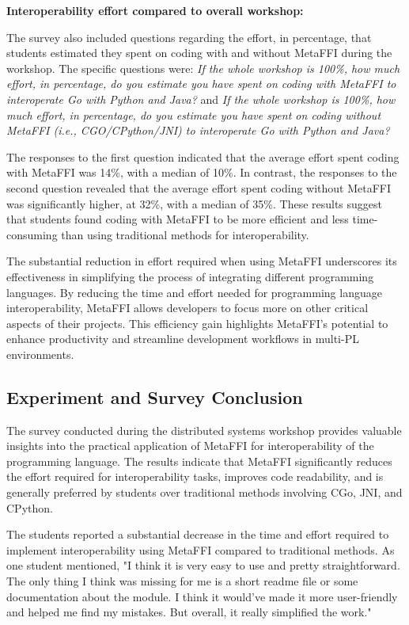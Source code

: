 \documentclass[sigplan,10pt,manuscript,nonacm]{acmart}
\begin{document}
\textbf{Interoperability effort compared to overall workshop:}

The survey also included questions regarding the effort, in percentage, that students estimated they spent on coding with and without MetaFFI during the workshop. The specific questions were: 
\textit{If the whole workshop is 100\%, how much effort, in percentage, do you estimate you have spent on coding with MetaFFI to interoperate Go with Python and Java?} and \textit{If the whole workshop is 100\%, how much effort, in percentage, do you estimate you have spent on coding without MetaFFI (i.e., CGO/CPython/JNI) to interoperate Go with Python and Java?}

The responses to the first question indicated that the average effort spent coding with MetaFFI was 14\%, with a median of 10\%. In contrast, the responses to the second question revealed that the average effort spent coding without MetaFFI was significantly higher, at 32\%, with a median of 35\%. These results suggest that students found coding with MetaFFI to be more efficient and less time-consuming than using traditional methods for interoperability.

The substantial reduction in effort required when using MetaFFI underscores its effectiveness in simplifying the process of integrating different programming languages. By reducing the time and effort needed for programming language interoperability, MetaFFI allows developers to focus more on other critical aspects of their projects. This efficiency gain highlights MetaFFI's potential to enhance productivity and streamline development workflows in multi-PL environments.



\subsection{Experiment and Survey Conclusion}
The survey conducted during the distributed systems workshop provides valuable insights into the practical application of MetaFFI for interoperability of the programming language. The results indicate that MetaFFI significantly reduces the effort required for interoperability tasks, improves code readability, and is generally preferred by students over traditional methods involving CGo, JNI, and CPython.

The students reported a substantial decrease in the time and effort required to implement interoperability using MetaFFI compared to traditional methods. As one student mentioned, "I think it is very easy to use and pretty straightforward. The only thing I think was missing for me is a short readme file or some documentation about the module. I think it would've made it more user-friendly and helped me find my mistakes. But overall, it really simplified the work."
\end{document}
